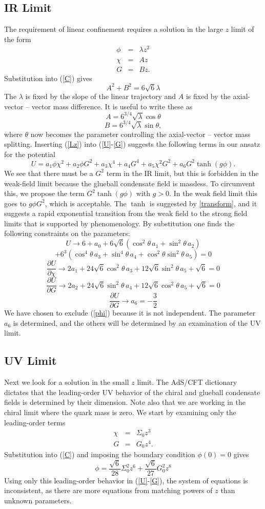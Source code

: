 \documentclass[12pt]{article}
\newcommand{\be}{\begin{equation}}
\newcommand{\ee}{\end{equation}}
\newcommand{\ba}{\begin{eqnarray}}
\newcommand{\ea}{\end{eqnarray}}
\newcommand{\bd}{\begin{displaymath}}
\newcommand{\ed}{\end{displaymath}}
\def\tthalf{{\textstyle{\frac{3}{2}}}}
\def\rt6{\sqrt{6}}
\begin{document}
\subsection{IR Limit}
The requirement of linear confinement requires a solution in the large $z$ limit of the  form
\ba
\phi &=& \lambda z^2 \\
\chi &=& Az \\
G &=& B z.
\label{Lz}
\ea
Substitution into (\ref{C}) gives
\be
A^2 + B^2 = 6\rt6 \lambda
\label{Clarge}
\ee
The $\lambda$ is fixed by the slope of the linear trajectory and $A$ is fixed by the axial-vector -- vector mass difference.  
It is useful to write these as
\bd
A = 6^{3/4} \sqrt{\lambda} \cos\theta
\ed
\be
B = 6^{3/4} \sqrt{\lambda} \sin\theta,
\ee
where $\theta$ now becomes the parameter controlling the axial-vector -- vector mass splitting.
Inserting (\ref{Lz}) into (\ref{U}-\ref{G}) suggests the following terms in our ansatz for the potential
\be
U =  a_1 \phi \chi^2 + a_2 \phi G^2 + a_3 \chi^4 + a_4 G^4 + a_5 \chi^2 G^2 
+ a_6 G^2 \tanh(g\phi).
\ee
We see that there must be a $G^2$ term in the IR limit, but this is forbidden in the weak-field limit because the glueball condensate field is massless. 
To circumvent this, we propose the term $G^2 \tanh(g\phi)$ with $g>0$.  
In the weak field limit this goes to $g\phi G^2$, which is acceptable.  
The $\tanh$ is suggested by \ref{transform}, and it suggests a rapid exponential transition from the weak field to the strong field limits that is supported by phenomenology.
By substitution one finds the following constraints on the parameters:
\bd
U \rightarrow 6 + a_0 + 6\rt6 \left( \cos^2 \theta \, a_1 + \sin^2 \theta \, a_2 \right)
\ed
\be
+ 6^3 \left( \cos^4 \theta \, a_3 + \sin^4 \theta \, a_4 + \cos^2 \theta \sin^2 \theta \, a_5 \right) = 0
\ee
\be
\frac{\partial U}{\partial \chi} \rightarrow
2a_1 + 24\rt6 \cos^2\theta \, a_3 + 12\rt6 \sin^2\theta \, a_5 + \rt6 = 0
\ee
\be
\frac{\partial U}{\partial G} \rightarrow
2a_2 + 24\rt6 \sin^2\theta \, a_4 + 12\rt6 \cos^2\theta \, a_5 + \rt6 = 0
\ee
\be
\frac{\partial U}{\partial G} \rightarrow
a_6 = - \tthalf \label{LargeZ2}
\ee
We have chosen to exclude (\ref{phi}) because it is not independent. 
The parameter $a_6$ is determined, and the others will be determined by an examination of the UV limit.

\subsection{UV Limit}
Next we look for a solution in the small $z$ limit. 
The AdS/CFT dictionary dictates that the leading-order UV behavior of the chiral and glueball condensate fields is determined by their dimension. 
Note also that we are working in the chiral limit where the quark mass is zero. 
We start by examining only the leading-order terms
\ba
\chi &=& \Sigma_0 z^3 \\
G &=& G_0 z^4.
\ea
Substitution into (\ref{C}) and imposing the boundary condition $\phi(0)=0$ gives
\be
\phi = \frac{\rt6}{28} \Sigma_0^2 z^6 + \frac{\rt6}{27} G_0^2 z^8
\label{Sz}
\ee
Using only this leading-order behavior in (\ref{U}-\ref{G}), the system of equations is inconsistent, as there are more equations from matching powers of $z$ than unknown parameters. 
\end{document}
